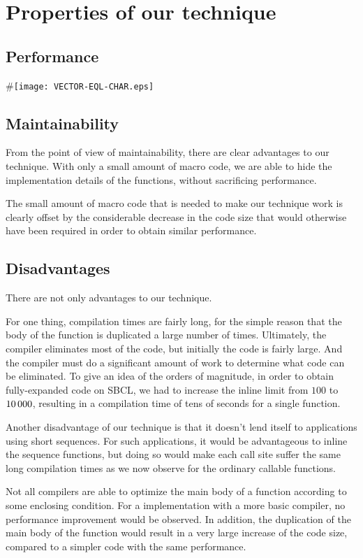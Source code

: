 \section{Properties of our technique}

\subsection{Performance}
#\texttt{[image: VECTOR-EQL-CHAR.eps]}
\subsection{Maintainability}

From the point of view of maintainability, there are clear advantages
to our technique.  With only a small amount of macro code, we are able
to hide the implementation details of the functions, without
sacrificing performance.

The small amount of macro code that is needed to make our technique
work is clearly offset by the considerable decrease in the code size
that would otherwise have been required in order to obtain similar
performance.

\subsection{Disadvantages}

There are not only advantages to our technique.

For one thing, compilation times are fairly long, for the simple
reason that the body of the function is duplicated a large number of
times.  Ultimately, the compiler eliminates most of the code, but
initially the code is fairly large.  And the compiler must do a
significant amount of work to determine what code can be eliminated.
To give an idea of the orders of magnitude, in order to obtain
fully-expanded code on SBCL, we had to increase the inline limit from
$100$ to $10\thinspace000$, resulting in a compilation time of tens of
seconds for a single function.

Another disadvantage of our technique is that it doesn't lend itself
to applications using short sequences.  For such applications, it
would be advantageous to inline the sequence functions, but doing so
would make each call site suffer the same long compilation times as we
now observe for the ordinary callable functions.

Not all compilers are able to optimize the main body of a function
according to some enclosing condition.  For a \commonlisp{}
implementation with a more basic compiler, no performance improvement
would be observed.  In addition, the duplication of the main body of
the function would result in a very large increase of the code size,
compared to a simpler code with the same performance.

